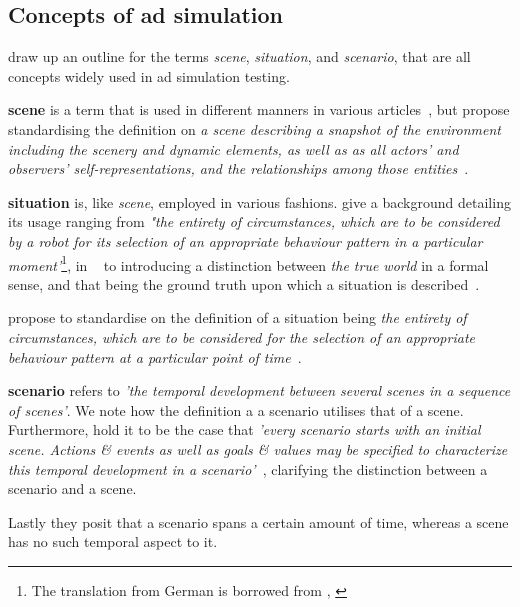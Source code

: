 \subsection{Concepts of \acrshort{ad} simulation}\label{sec:adsSimConcepts}

\citeauthor{scenes} draw up an outline for the terms \textit{scene}, \textit{situation}, and
\textit{scenario}, that are all concepts widely used in \acrshort{ad} simulation testing.

\textbf{scene} is a term that is used in different manners in various
articles~\cite[982]{scenes}, but \citeauthor{scenes} propose standardising the definition on
\textit{a scene describing a snapshot of the environment including the scenery and dynamic elements,
    as well as  as all actors’ and observers’ self-representations, and the relationships among those entities}~\cite[983]{scenes}.

\textbf{situation} is, like \textit{scene}, employed in various fashions. \citeauthor{scenes}
give a background detailing its usage ranging from \textit{"the entirety of circumstances,
    which are to be considered by a robot for its selection of an appropriate behaviour pattern in a
    particular moment'}\footnote{The translation from German is borrowed from \citeauthor{scenes},
    \cite[984]{scenes}}, in  \citeauthor{scenarioTysk}~\cite[3]{scenarioTysk} to
\citeauthor{schmidtScenario} introducing a distinction between \textit{the true world} in a formal
sense, and that being the ground truth upon which a situation is
described~\cite[892]{schmidtScenario}.

\citeauthor{scenes} propose to standardise on the definition of a situation being \textit{
    the entirety of circumstances, which  are to be considered for the selection of an
    appropriate behaviour pattern at a particular point of time}~\cite[985]{scenes}.

\textbf{scenario} refers to \textit{'the temporal development between several scenes in a sequence
    of scenes'}\cite[986]{scenes}. We note how the definition a a scenario utilises that of a scene.
Furthermore, \citeauthor{scenes} hold it to be the case that \textit{'every scenario starts with an
    initial scene. Actions \& events as well as goals \& values may be  specified to characterize
    this temporal development in a scenario'}~\cite[986]{scenes}, clarifying the distinction
between a scenario and a scene.

Lastly they posit that a scenario spans a certain amount of time, whereas a scene has no such
temporal aspect to it.



